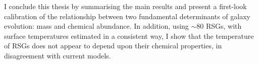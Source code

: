 I conclude this thesis by summarising the main results and present a first-look calibration of the relationship between two fundamental determinants of galaxy evolution: mass and chemical abundance.
In addition, using $\sim$80 RSGs, with surface temperatures estimated in a consistent way, I show that the temperature of RSGs does not appear to depend upon their chemical properties, in disagreement with current models.


% 
